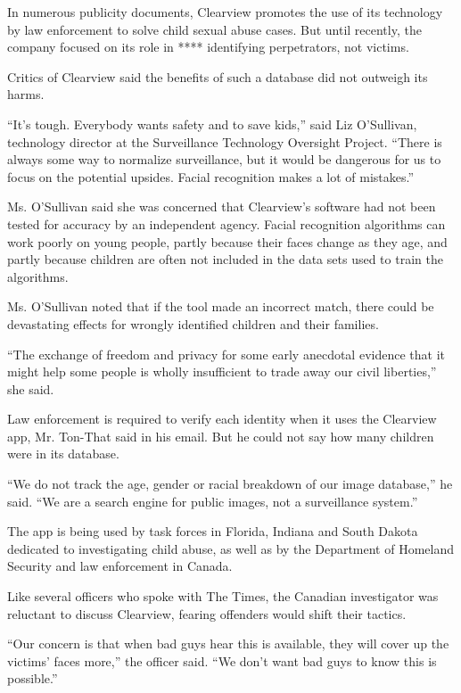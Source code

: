 In numerous publicity documents, Clearview promotes the use of its
technology by law enforcement to solve child sexual abuse cases. But
until recently, the company focused on its role in **** identifying
perpetrators, not victims.

Critics of Clearview said the benefits of such a database did not
outweigh its harms.

``It's tough. Everybody wants safety and to save kids,'' said Liz
O'Sullivan, technology director at the Surveillance Technology Oversight
Project. ``There is always some way to normalize surveillance, but it
would be dangerous for us to focus on the potential upsides. Facial
recognition makes a lot of mistakes.''

Ms. O'Sullivan said she was concerned that Clearview's software had not
been tested for accuracy by an independent agency. Facial recognition
algorithms can work poorly on young people, partly because their faces
change as they age, and partly because children are often not included
in the data sets used to train the algorithms.

Ms. O'Sullivan noted that if the tool made an incorrect match, there
could be devastating effects for wrongly identified children and their
families.

``The exchange of freedom and privacy for some early anecdotal evidence
that it might help some people is wholly insufficient to trade away our
civil liberties,'' she said.

Law enforcement is required to verify each identity when it uses the
Clearview app, Mr. Ton-That said in his email. But he could not say how
many children were in its database.

``We do not track the age, gender or racial breakdown of our image
database,'' he said. ``We are a search engine for public images, not a
surveillance system.''

The app is being used by task forces in Florida, Indiana and South
Dakota dedicated to investigating child abuse, as well as by the
Department of Homeland Security and law enforcement in Canada.

Like several officers who spoke with The Times, the Canadian
investigator was reluctant to discuss Clearview, fearing offenders would
shift their tactics.

``Our concern is that when bad guys hear this is available, they will
cover up the victims' faces more,'' the officer said. ``We don't want
bad guys to know this is possible.''

